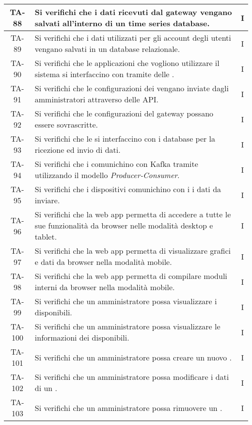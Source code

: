 \begin{center}
\begin{longtable}{|c|p{10cm}|c|}
			 \hline
			 TA-88 & Si verifichi che i dati ricevuti dal gateway vengano salvati all'interno di un time series database. & I \\
			 \hline
			 TA-89 & Si verifichi che i dati utilizzati per gli account degli utenti vengano salvati in un database relazionale. & I \\
			 \hline
			 TA-90 & Si verifichi che le applicazioni che vogliono utilizzare il sistema si interfaccino con \glock{Kafka} tramite delle \glock{API}. & I \\
			 \hline
			 TA-91 & Si verifichi che le configurazioni dei \glock{gateway} vengano inviate dagli amministratori attraverso delle API. & I \\
			 \hline
			 TA-92 & Si verifichi che le configurazioni del gateway possano essere sovrascritte. & I \\
			 \hline
			 TA-93 & Si verifichi che le \glock{API} si interfaccino con i database per la ricezione ed invio di dati. & I \\
			 \hline
			 TA-94 & Si verifichi che i \glock{gateway} comunichino con Kafka tramite \glock{topic} utilizzando il modello \textit{Producer-Consumer}. & I \\
			 \hline
			 TA-95 & Si verifichi che i dispositivi comunichino con i \glock{gateway} i dati da inviare. & I \\
			 \hline
			 TA-96 & Si verifichi che la web app permetta di accedere a tutte le sue funzionalità da browser nelle modalità desktop e tablet. & I \\
			 \hline
			 TA-97 & Si verifichi che la web app permetta di visualizzare grafici e dati da browser nella modalità mobile. & I \\
			 \hline
			 TA-98 & Si verifichi che la web app permetta di compilare moduli interni da browser nella modalità mobile. & I \\
			 \hline
			 TA-99 & Si verifichi che un amministratore possa visualizzare i \glock{gateway} disponibili. & I \\
			 \hline
			 TA-100 & Si verifichi che un amministratore possa visualizzare le informazioni dei \glock{gateway} disponibili. & I \\
			 \hline
			 TA-101 & Si verifichi che un amministratore possa creare un nuovo \glock{gateway}. & I \\
			 \hline
			 TA-102 & Si verifichi che un amministratore possa modificare i dati di un \glock{gateway}. & I \\
			 \hline
			 TA-103 & Si verifichi che un amministratore possa rimuovere un \glock{gateway}. & I \\

\end{longtable}
\end{center}
